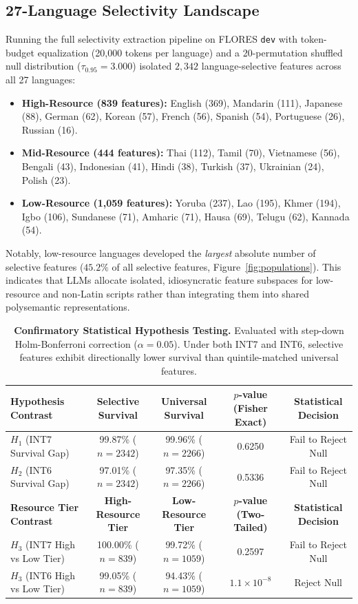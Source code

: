 \documentclass[11pt]{article}
\begin{document}
\subsection{27-Language Selectivity Landscape}
Running the full selectivity extraction pipeline on FLORES \texttt{dev} with token-budget equalization (20,000 tokens per language) and a 20-permutation shuffled null distribution ($\tau_{0.95} = 3.000$) isolated $2,342$ language-selective features across all 27 languages:
\begin{itemize}
    \item \textbf{High-Resource (839 features):} English (369), Mandarin (111), Japanese (88), German (62), Korean (57), French (56), Spanish (54), Portuguese (26), Russian (16).
    \item \textbf{Mid-Resource (444 features):} Thai (112), Tamil (70), Vietnamese (56), Bengali (43), Indonesian (41), Hindi (38), Turkish (37), Ukrainian (24), Polish (23).
    \item \textbf{Low-Resource (1,059 features):} Yoruba (237), Lao (195), Khmer (194), Igbo (106), Sundanese (71), Amharic (71), Hausa (69), Telugu (62), Kannada (54).
\end{itemize}
Notably, low-resource languages developed the \emph{largest} absolute number of selective features ($45.2\%$ of all selective features, Figure~\ref{fig:populations}). This indicates that LLMs allocate isolated, idiosyncratic feature subspaces for low-resource and non-Latin scripts rather than integrating them into shared polysemantic representations.

\begin{table}[!tp]
\centering
\small
\setlength{\tabcolsep}{5pt}
\begin{tabular*}{\textwidth}{@{\extracolsep{\fill}}lcccc@{}}
\toprule
\textbf{Hypothesis Contrast} & \textbf{Selective Survival} & \textbf{Universal Survival} & \textbf{$p$-value (Fisher Exact)} & \textbf{Statistical Decision} \\
\midrule
$H_1$ (INT7 Survival Gap) & 99.87\% ($n=2342$) & 99.96\% ($n=2266$) & 0.6250 & Fail to Reject Null \\
$H_2$ (INT6 Survival Gap) & 97.01\% ($n=2342$) & 97.35\% ($n=2266$) & 0.5336 & Fail to Reject Null \\
\midrule
\textbf{Resource Tier Contrast} & \textbf{High-Resource Tier} & \textbf{Low-Resource Tier} & \textbf{$p$-value (Two-Tailed)} & \textbf{Statistical Decision} \\
\midrule
$H_3$ (INT7 High vs Low Tier) & 100.00\% ($n=839$) & 99.72\% ($n=1059$) & 0.2597 & Fail to Reject Null \\
$H_3$ (INT6 High vs Low Tier) & 99.05\% ($n=839$) & 94.43\% ($n=1059$) & $1.1\times10^{-8}$ & Reject Null \\
\bottomrule
\end{tabular*}
\caption{\textbf{Confirmatory Statistical Hypothesis Testing.} Evaluated with step-down Holm-Bonferroni correction ($\alpha = 0.05$). Under both INT7 and INT6, selective features exhibit directionally lower survival than quintile-matched universal features.}
\label{tab:statistical_decisions}
\end{table}
\end{document}
